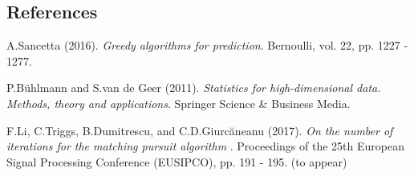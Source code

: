 \documentclass[12pt]{article}
\begin{document}
%        
%
%        

\subsection*{References}

\begin{description}

\item
A.Sancetta (2016).
\textit{Greedy algorithms for prediction}.
Bernoulli, vol. 22, pp. 1227 - 1277.

\item
P.B\"{u}hlmann and S.van de Geer (2011).
\textit{Statistics for high-dimensional data. Methods, theory and applications}. 
Springer Science \& Business Media.

\item
F.Li, C.Triggs, B.Dumitrescu, and C.D.Giurc\u{a}neanu (2017).
\textit{On the number of iterations for the matching pursuit algorithm} .
Proceedings of the 25th European Signal Processing Conference (EUSIPCO), pp. 191 - 195.
(to appear)


\end{description}
\end{document}
